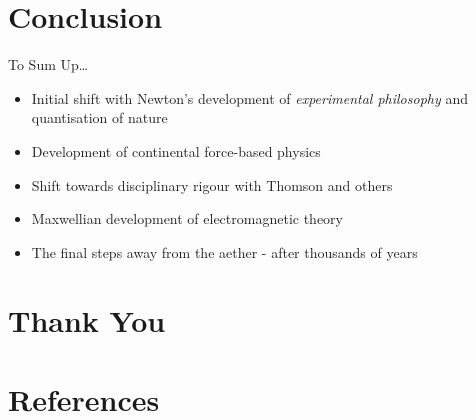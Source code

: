 \documentclass{beamer}
\begin{document}
\section{Conclusion}%
\begin{frame}{To Sum Up\ldots}
	\begin{itemize}
		\item Initial shift with Newton's development of \emph{experimental philosophy} and quantisation of nature
		\item  Development of continental force-based physics 
		\item  Shift towards disciplinary rigour with Thomson and others
		\item  Maxwellian development of electromagnetic theory
		\item The final steps away from the aether - after thousands of years
	\end{itemize}
\end{frame}
\section{\color{mGreen}Thank You}%
\section{References}%
\begin{frame}[allowframebreaks]
	\nocite{*}
	\printbibliography[heading=none]
\end{frame}
\end{document}
